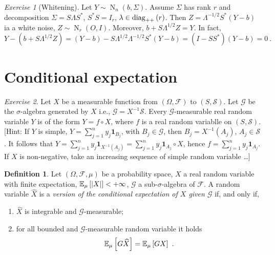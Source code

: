 \documentclass[12pt,a4paper]{amsart}
\newcommand{\gaussian}[3]{\operatorname{N}_{#1}\left(#2,#3\right)}
\newcommand{\one}{\bm 1}
\newcommand{\ppdiag}[1]{\diag_{++}\left(#1\right)}
\theoremstyle{plain}%
\theoremstyle{definition}
\newtheorem{definition}{Definition}%
\theoremstyle{remark}
\newtheorem{exercise}{Exercise}
\begin{document}
\begin{exercise}[Whitening]
  Let $Y \sim \gaussian n b \Sigma$. Assume $\Sigma$ has rank $r$ and decomposition $\Sigma = S \Lambda S^*$, $S^*S=I_r$, $\lambda \in \ppdiag r$. Then $Z = \Lambda^{-{1/2}} S^* (Y-b)$ ia a white noise, $Z \sim \gaussian r O I$. Moreover, $b + S\Lambda^{1/2} Z = Y$. In fact, 
  \begin{equation*}
    Y - (b + S\Lambda^{1/2} Z) = (Y-b) - S\Lambda^{1/2}\Lambda^{-1/2}S^*(Y-b) = (I-SS^*)(Y-b) = 0 \ .
  \end{equation*}
\end{exercise}

\section{Conditional expectation}

\begin{exercise}
Let $X$ be a measurable function from $(\Omega,\mathcal F)$ to $(S,\mathcal S)$. Let $\mathcal G$ be the $\sigma$-algebra generated by $X$ i.e., $\mathcal G = X^{-1} \mathcal S$. Every $\mathcal G$-measurable real random variable $Y$ is of the form $Y = f \circ X$, where $f$ is a real random variablle on $(S,\mathcal S)$. [Hint: If $Y$ is simple, $Y = \sum_{j=1}^n y_j \one_{B_j}$, with $B_j \in \mathcal G$, then $B_j = X^{-1}(A_j)$, $A_j \in \mathcal S$. It follows that $Y = \sum_{j=1}^n y_j \one_{X^{-1}(A_j)} = \sum_{j=1}^n y_j \one_{A_j}\circ X$, hence $f = \sum_{j=1}^n y_j \one_{A_j}$. If $X$ is non-negative, take an increasing sequence of simple random variable \dots]
\end{exercise}

\begin{definition}
Let $(\Omega, \mathcal F, \mu)$ be a probability space, $X$ a real random variable with finite expectation, $\operatorname{\mathbb E}_{\mu}\left[\left\vert X\right\vert\right] < + \infty$, $\mathcal G$ a sub-$\sigma$-algebra of $\mathcal F$. A random variable $\widehat X$ is a \emph{version of the conditional expectation of $X$ given $\mathcal G$} if, and only if,
\begin{enumerate}
\item $\widehat X$ is integrable and $\mathcal G$-measurable;
\item for all bounded and $\mathcal G$-measurable random variable it holds
  \begin{equation*}
    \operatorname{\mathbb E}_{\mu}\left[G\widehat X\right] = \operatorname{\mathbb E}_{\mu}\left[GX\right] \ .
  \end{equation*}
\end{enumerate}
\end{definition}
\end{document}
